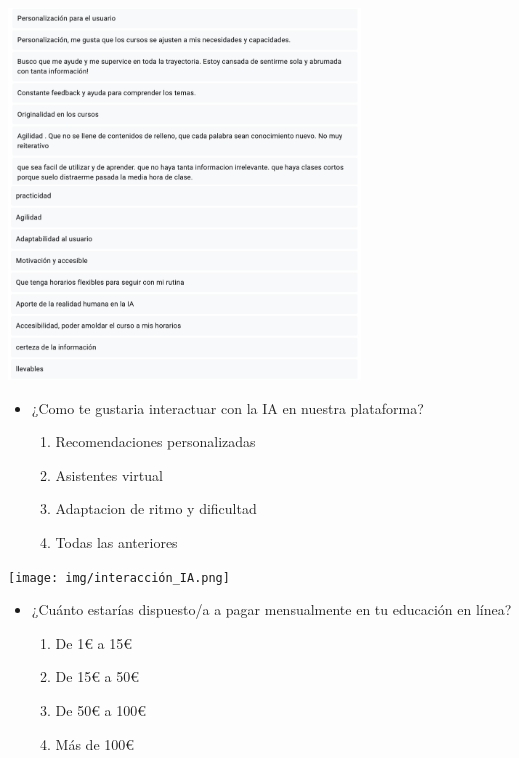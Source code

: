 \documentclass[
]{article}
\providecommand{\tightlist}{%
  \setlength{\itemsep}{0pt}\setlength{\parskip}{0pt}}
\begin{document}
\includegraphics[width=0.7\textwidth,height=\textheight]{img/caracteristicas.png}

\newpage

\begin{itemize}
\tightlist
\item
  ¿Como te gustaria interactuar con la IA en nuestra plataforma?

  \begin{enumerate}
  \def\labelenumi{\alph{enumi}.}
  \tightlist
  \item
    Recomendaciones personalizadas
  \item
    Asistentes virtual
  \item
    Adaptacion de ritmo y dificultad
  \item
    Todas las anteriores
  \end{enumerate}
\end{itemize}

\texttt{[image: img/interacción\_IA.png]}

\begin{itemize}
\tightlist
\item
  ¿Cuánto estarías dispuesto/a a pagar mensualmente en tu educación en
  línea?

  \begin{enumerate}
  \def\labelenumi{\alph{enumi}.}
  \tightlist
  \item
    De 1€ a 15€
  \item
    De 15€ a 50€
  \item
    De 50€ a 100€
  \item
    Más de 100€
  \end{enumerate}
\end{itemize}
\end{document}
